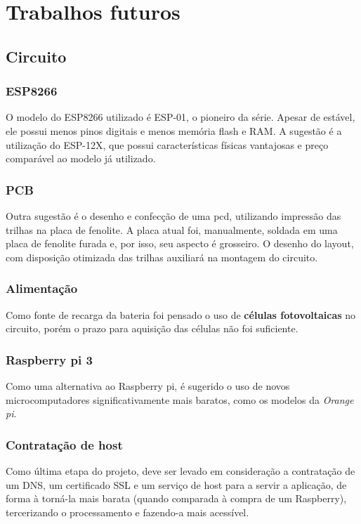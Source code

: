 \documentclass[
12pt,				%
openany,			%
twoside,			%
a4paper,			%
english,			%
french,				%
spanish,			%
brazil,				%
]{abntex2}
\begin{document}
\part{Trabalhos futuros}

\chapter{Circuito}
\section{ESP8266}
O modelo do ESP8266 utilizado é ESP-01, o pioneiro da série. Apesar de estável, ele possui menos pinos digitais e menos memória flash e RAM. A sugestão é a utilização do ESP-12X, que possui características físicas vantajosas e preço comparável ao modelo já utilizado.  

\section{PCB}
Outra sugestão é o desenho e confecção de uma pcd, utilizando impressão das trilhas na placa de fenolite. A placa atual foi, manualmente, soldada em uma placa de fenolite furada e, por isso, seu aspecto é grosseiro. O desenho do layout, com disposição otimizada das trilhas auxiliará na montagem do circuito.

\section{Alimentação}
Como fonte de recarga da bateria foi pensado o uso de \textbf{células fotovoltaicas} no circuito, porém o prazo para aquisição das células não foi suficiente.

\section{Raspberry pi 3}
Como uma alternativa ao Raspberry pi, é sugerido o uso de novos microcomputadores significativamente mais baratos, como os modelos da \textit{Orange pi}. 

\section{Contratação de host}
Como última etapa do projeto, deve ser levado em consideração a contratação de um DNS, um certificado SSL e um serviço de host para a servir a aplicação, de forma à torná-la mais barata (quando comparada à compra de um Raspberry), tercerizando o processamento e fazendo-a mais acessível.
\end{document}
